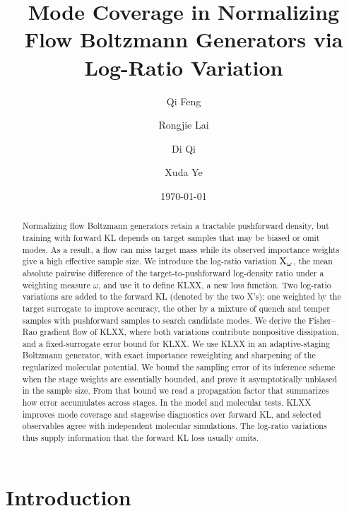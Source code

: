 \documentclass{article}
\title{Mode Coverage in Normalizing Flow Boltzmann Generators via Log-Ratio Variation}
\author[1]{Qi Feng}
\author[2]{Rongjie Lai}
\author[2]{Di Qi}
\author[2]{Xuda Ye}
\affil[1]{Department of Mathematics, Florida State University, Tallahassee, FL 32306}
\affil[2]{Department of Mathematics, Purdue University, West Lafayette, IN 47907}
\date{\today}
\begin{document}
\maketitle

\begin{abstract}
Normalizing flow Boltzmann generators retain a tractable pushforward density, but training with forward KL depends on target samples that may be biased or omit modes. As a result, a flow can miss target mass while its observed importance weights give a high effective sample size. We introduce the log-ratio variation $\mathrm{X}_\omega$, the mean absolute pairwise difference of the target-to-{pushforward} log-density ratio under a weighting measure $\omega$, and use it to define KLXX, a new loss function. Two log-ratio variations are added to the forward KL (denoted by the two X's): one weighted by the target surrogate to improve accuracy, the other by a mixture of quench and temper samples with pushforward samples to search candidate modes. We derive {\color{blue}the Fisher--Rao gradient flow of KLXX, where both variations contribute nonpositive dissipation,} and a fixed-surrogate error bound for KLXX. {\color{blue}We} use KLXX in an adaptive-staging Boltzmann generator, with exact importance reweighting and sharpening of the regularized molecular potential. We bound the sampling error of {\color{blue}its inference scheme} {\color{purple}when the stage weights are essentially bounded}, and prove it asymptotically unbiased in the sample size. From that bound we read a propagation factor that summarizes how error accumulates across stages. In the model and molecular tests, KLXX improves mode coverage and stagewise diagnostics {\color{blue}over forward KL}, and selected observables agree with independent molecular simulations. The log-ratio variations thus supply information that the forward KL loss usually omits.
\end{abstract}

\par\medskip
\noindent{}
\par\medskip

\section{Introduction}
\label{sec: intro}
\end{document}
